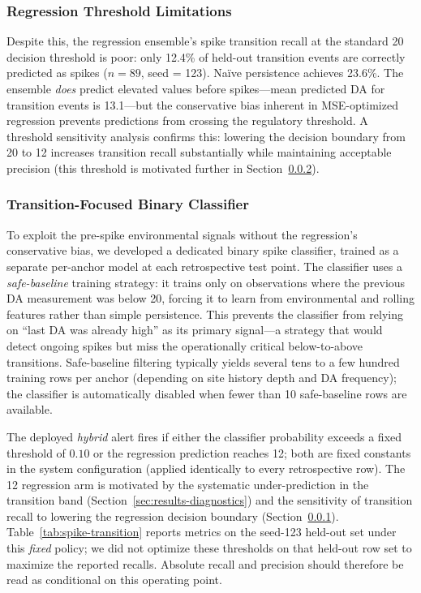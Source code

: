 \documentclass[toxins,article,submit,moreauthors]{Definitions/mdpi}
\begin{document}
\subsubsection{Regression Threshold Limitations}
\label{sec:results-threshold-limit}

Despite this, the regression ensemble's spike transition recall at the standard \SI{20}{\microgrampeg} decision threshold is poor: only 12.4\% of held-out transition events are correctly predicted as spikes ($n = 89$, seed = 123). Na\"ive persistence achieves 23.6\%. The ensemble \emph{does} predict elevated values before spikes---mean predicted DA for transition events is \SI{13.1}{\microgrampeg}---but the conservative bias inherent in MSE-optimized regression prevents predictions from crossing the regulatory threshold. A threshold sensitivity analysis confirms this: lowering the decision boundary from 20 to \SI{12}{\microgrampeg} increases transition recall substantially while maintaining acceptable precision (this threshold is motivated further in Section~\ref{sec:results-spike-classifier}).

\subsubsection{Transition-Focused Binary Classifier}
\label{sec:results-spike-classifier}

To exploit the pre-spike environmental signals without the regression's conservative bias, we developed a dedicated binary spike classifier, trained as a separate per-anchor model at each retrospective test point. The classifier uses a \emph{safe-baseline} training strategy: it trains only on observations where the previous DA measurement was below \SI{20}{\microgrampeg}, forcing it to learn from environmental and rolling features rather than simple persistence. This prevents the classifier from relying on ``last DA was already high'' as its primary signal---a strategy that would detect ongoing spikes but miss the operationally critical below-to-above transitions. Safe-baseline filtering typically yields several tens to a few hundred training rows per anchor (depending on site history depth and DA frequency); the classifier is automatically disabled when fewer than 10 safe-baseline rows are available.

The deployed \emph{hybrid} alert fires if either the classifier probability exceeds a fixed threshold of $0.10$ or the regression prediction reaches \SI{12}{\microgrampeg}; both are fixed constants in the system configuration (applied identically to every retrospective row). The \SI{12}{\microgrampeg} regression arm is motivated by the systematic under-prediction in the transition band (Section~\ref{sec:results-diagnostics}) and the sensitivity of transition recall to lowering the regression decision boundary (Section~\ref{sec:results-threshold-limit}). Table~\ref{tab:spike-transition} reports metrics on the seed-123 held-out set under this \emph{fixed} policy; we did not optimize these thresholds on that held-out row set to maximize the reported recalls. Absolute recall and precision should therefore be read as conditional on this operating point.
\end{document}
